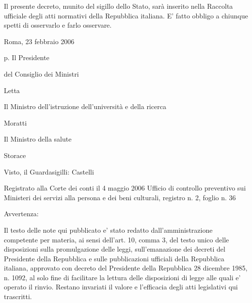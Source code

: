 Il presente decreto, munito del sigillo dello Stato, sarà inserito nella Raccolta ufficiale degli atti normativi della Repubblica italiana. E' fatto obbligo a chiunque spetti di osservarlo e farlo osservare.

    Roma, 23 febbraio 2006

    p. Il Presidente
    
    del Consiglio dei Ministri
    
    Letta

    Il Ministro dell'istruzione dell'università e della ricerca
    
    Moratti

    Il Ministro della salute
    
    Storace

    Visto, il Guardasigilli: Castelli
    
    Registrato alla Corte dei conti il 4 maggio 2006
    Ufficio di controllo preventivo sui Ministeri dei servizi 
    alla persona e dei beni culturali, registro n. 2, foglio n. 36   
    
     Avvertenza:

    Il testo delle note qui pubblicato e' stato redatto dall'amministrazione competente per materia, ai sensi dell'art. 10, comma 3, del testo unico delle disposizioni sulla promulgazione delle leggi, sull'emanazione dei decreti del Presidente della Repubblica e sulle pubblicazioni ufficiali della Repubblica italiana, approvato con decreto del Presidente della Repubblica 28 dicembre 1985, n. 1092, al solo fine di facilitare la lettura delle disposizioni di legge alle quali e' operato il rinvio. Restano invariati il valore e l'efficacia degli atti legislativi qui trascritti.


